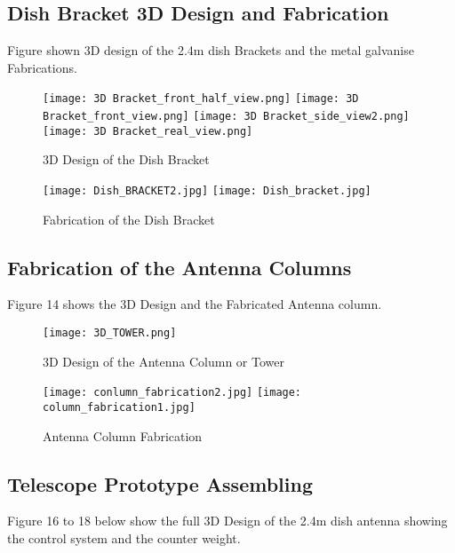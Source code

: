 {\vspace{1cm}

\subsection{Dish Bracket 3D Design and Fabrication}

Figure shown 3D design of the 2.4m dish Brackets and the metal galvanise Fabrications.

\begin{figure}[htp]
    \centering
\texttt{[image: 3D Bracket\_front\_half\_view.png]}
 \texttt{[image: 3D Bracket\_front\_view.png]}
    \texttt{[image: 3D Bracket\_side\_view2.png]}
    \texttt{[image: 3D Bracket\_real\_view.png]}
    \caption{3D Design of the Dish Bracket}
    \label{fig:galaxy}
\vspace{0.5cm}
    \centering
    \texttt{[image: Dish\_BRACKET2.jpg]}
    \texttt{[image: Dish\_bracket.jpg]}
    \caption{Fabrication of the Dish Bracket}
    \label{fig:galaxy}
\end{figure}

\vspace{1cm}

\subsection{Fabrication of the Antenna Columns}
Figure 14 shows the 3D Design and the Fabricated Antenna column.
\begin{figure}[htp]
    \centering
\texttt{[image: 3D\_TOWER.png]}
\caption{3D Design of the Antenna Column or Tower}
\label{fig:galaxy }

\texttt{[image: conlumn\_fabrication2.jpg]} 
\texttt{[image: column\_fabrication1.jpg]}
\caption{Antenna Column Fabrication}
\label{fig:galaxy }
\end{figure}

\vspace{1cm}

\subsection{Telescope Prototype Assembling }

 Figure 16 to 18 below show the full 3D Design of the 2.4m dish antenna showing the control system and the counter weight.

}
